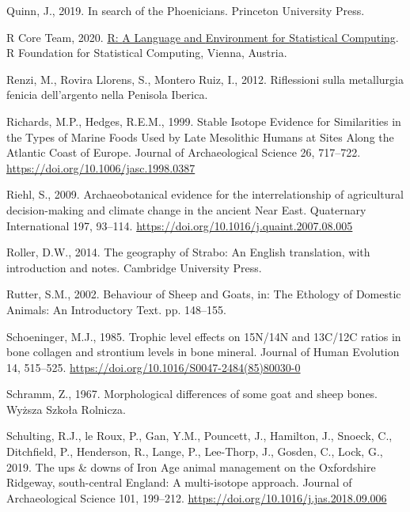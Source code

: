 \documentclass[3p]{elsarticle} %
\newlength{\cslhangindent}
\newlength{\cslentryspacingunit} %
\newenvironment{CSLReferences}[2] %
 {%
  \setlength{\parindent}{0pt}
  \ifodd #1
  \let\oldpar\par
  \def\par{\hangindent=\cslhangindent\oldpar}
  \fi
  \setlength{\parskip}{#2\cslentryspacingunit}
 }%
 {}
\begin{document}
\begin{CSLReferences}{1}{0}
\leavevmode{}%
Quinn, J., 2019. In search of the {Phoenicians}. {Princeton University Press}.

\leavevmode{}%
R Core Team, 2020. \href{https://www.R-project.org/}{R: {A Language} and {Environment} for {Statistical Computing}}. {R Foundation for Statistical Computing}, {Vienna, Austria}.

\leavevmode{}%
Renzi, M., Rovira Llorens, S., Montero Ruiz, I., 2012. Riflessioni sulla metallurgia fenicia dell'argento nella {Penisola Iberica}.

\leavevmode{}%
Richards, M.P., Hedges, R.E.M., 1999. Stable {Isotope Evidence} for {Similarities} in the {Types} of {Marine Foods Used} by {Late Mesolithic Humans} at {Sites Along} the {Atlantic Coast} of {Europe}. Journal of Archaeological Science 26, 717--722. \url{https://doi.org/10.1006/jasc.1998.0387}

\leavevmode{}%
Riehl, S., 2009. Archaeobotanical evidence for the interrelationship of agricultural decision-making and climate change in the ancient {Near East}. Quaternary International 197, 93--114. \url{https://doi.org/10.1016/j.quaint.2007.08.005}

\leavevmode{}%
Roller, D.W., 2014. The geography of {Strabo}: {An English} translation, with introduction and notes. {Cambridge University Press}.

\leavevmode{}%
Rutter, S.M., 2002. Behaviour of {Sheep} and {Goats}, in: The Ethology of Domestic Animals: {An} Introductory Text. pp. 148--155.

\leavevmode{}%
Schoeninger, M.J., 1985. Trophic level effects on {15N}/{14N} and {13C}/{12C} ratios in bone collagen and strontium levels in bone mineral. Journal of Human Evolution 14, 515--525. \url{https://doi.org/10.1016/S0047-2484(85)80030-0}

\leavevmode{}%
Schramm, Z., 1967. Morphological differences of some goat and sheep bones. {Wyższa Szkoła Rolnicza}.

\leavevmode{}%
Schulting, R.J., le Roux, P., Gan, Y.M., Pouncett, J., Hamilton, J., Snoeck, C., Ditchfield, P., Henderson, R., Lange, P., Lee-Thorp, J., Gosden, C., Lock, G., 2019. The ups \& downs of {Iron Age} animal management on the {Oxfordshire Ridgeway}, south-central {England}: A multi-isotope approach. Journal of Archaeological Science 101, 199--212. \url{https://doi.org/10.1016/j.jas.2018.09.006}


\end{CSLReferences}
\end{document}
